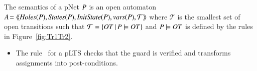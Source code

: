 \documentclass{elsarticle}
\newcommand{\TODO}[1]{\textcolor{red}{\textbf{[TODO:#1]}}}
\begin{document}
\begin{definition}
	\label{def:operationalSemantics} The semantics of a pNet $P$ is an open automaton $A\!= 
	\mylangle \symb{Holes}(\pNet),\symb{States}(\pNet),\symb{InitState}(\pNet),\symb{vars}(P),\mathcal{T} \myrangle$ where $\mathcal{T}$   is the smallest set of open transitions such that $\mathcal{T}=\{OT\,|\,P \models OT \}$ and	$P \models OT$	is defined by the rules in Figure~\ref{fig:Tr1Tr2}.
	


\begin{itemize}
\item The rule \TrUn\ for a pLTS  checks that the guard is verified and transforms assignments into post-conditions.

	

\end{itemize}
\end{definition}
\end{document}
